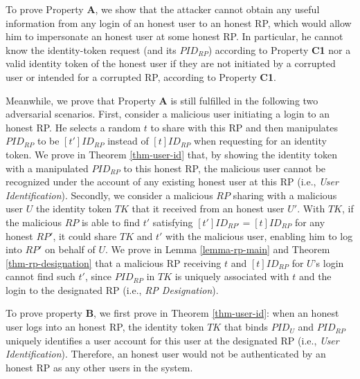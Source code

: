 To prove Property {\bf A}, we show that the attacker cannot obtain any useful information from any login of an honest user to an honest RP, which would allow him to impersonate an honest user at some honest RP. In particular, he cannot know the identity-token request (and its $PID_{RP}$) according to Property {\bf C1} nor a valid identity token of the honest user if they are not initiated by a corrupted user or intended for a corrupted RP, according to Property {\bf C1}.  

Meanwhile, we prove that Property {\bf A} is still fulfilled in the following two adversarial scenarios. First, consider a malicious user initiating a login to an honest RP. He selects a random $t$ to share with this RP and then manipulates $PID_{RP}$ to be $[t']ID_{RP}$ instead of $[t]ID_{RP}$ when requesting for an identity token. We prove in Theorem \ref{thm-user-id} that, by showing the identity token with a manipulated $PID_{RP}$ to this honest RP, the malicious user cannot be recognized under the account of any existing honest user at this RP (i.e., {\em User Identification}). Secondly, we consider a malicious $RP$ sharing with a malicious user $U$ the identity token $TK$ that it received from an honest user $U'$. With $TK$, if the malicious $RP$ is able to find $t'$ satisfying $[t']ID_{RP'}=[t]ID_{RP}$ for any honest $RP'$, it could share $TK$ and $t'$ with the malicious user, enabling him to log into $RP'$ on behalf of $U$. We prove in Lemma \ref{lemma-rp-main} and Theorem \ref{thm-rp-designation} that a malicious RP receiving $t$ and $[t]ID_{RP}$ for $U$'s login cannot find such $t'$, since $PID_{RP}$ in $TK$ is uniquely associated with $t$ and the login to the designated RP (i.e., {\em RP Designation}).


To prove property {\bf B}, we first prove in Theorem \ref{thm-user-id}: when an honest user logs into an honest RP, the identity token $TK$ that binds $PID_U$ and $PID_{RP}$ uniquely identifies a user account for this user at the designated RP (i.e., {\em User Identification}). Therefore, an honest user would not be authenticated by an honest RP as any other users in the system.

